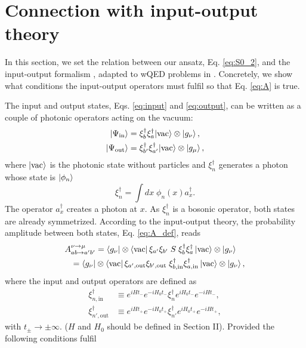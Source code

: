 \documentclass[notitlepage, prx, preprint, amsmath,superscriptaddress,amssymb]{revtex4-1}
\begin{document}
\section{Connection with input-output theory}\label{sec:inout}

In this section, we set the relation between our ansatz, Eq. \eqref{eq:S0_2}, and the input-output formalism \cite{Gardiner1985}, adapted to wQED problems in \cite{Fan2010}. Concretely, we show what conditions the input-output operators must fulfil so that Eq. \eqref{eq:A} is true.

The input and output states, Eqs. \eqref{eq:input} and \eqref{eq:output}, can be written as a couple of photonic operators acting on the vacuum:
\begin{align}
\label{eq:input_inout}|\Psi_\text{in}\rangle & = \xi_b^\dagger \xi_a^\dagger|\text{vac}\rangle \otimes \ket{g_\nu},\\
\label{eq:output_inout}|\Psi_\text{out}\rangle & = \xi_{b'}^\dagger \xi_{a'}^\dagger|\text{vac}\rangle \otimes \ket{g_\mu},
\end{align}
where $\ket{\text{vac}}$ is the photonic state without particles and $\xi_n^\dagger$ generates a photon whose state is $\ket{\phi_n}$
\begin{equation}
\xi_n^\dagger = \int dx\; \phi_n(x) a_x^\dagger.
\end{equation}
The operator $a_x^\dagger$ creates a photon at $x$. As $\xi_n^\dagger$ is a bosonic operator, both states are already symmetrized. According to the input-output theory, the probability amplitude between both states, Eq. \eqref{eq:A_def}, reads \cite{Fan2010}
\begin{align}\label{eq:A_inout}
A_{ab\to a'b'}^{\nu\to\mu}&=\bra{g_\nu}\otimes\bra{\text{vac}}\xi_{a'}\xi_{b'}\;S\;\xi_b^\dagger\xi_a^\dagger
\ket{\text{vac}}\otimes\ket{g_\nu}\nonumber\\
=\bra{g_\nu}&\otimes\bra{\text{vac}}\xi_{a',\text{out}}\xi_{b',\text{out}}\;\xi_{b,\text{in}}^\dagger\xi_{a,\text{in}}^\dagger
\ket{\text{vac}}\otimes\ket{g_\nu},
\end{align}
where the input and output operators are defined as
\begin{align}
\xi_{n,\text{in}}^\dagger & \equiv e^{iHt_-} e^{-iH_0t_-}\xi_n^\dagger e^{iH_0 t_-} e^{-iHt_-},\\
\xi_{n',\text{out}}^\dagger & \equiv e^{iHt_+} e^{-iH_0t_+}\xi_{n'}^\dagger e^{iH_0 t_+} e^{-iHt_+},
\end{align}
with $t_\pm \to\pm\infty$. {\color{blue}($H$ and $H_0$ should be defined in Section II)}. Provided the following conditions fulfil
\end{document}
